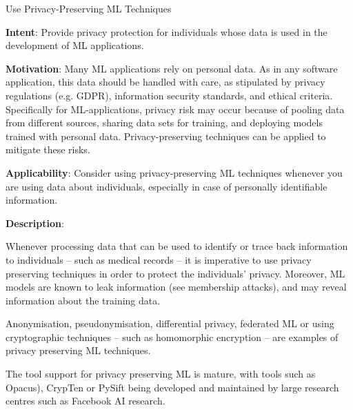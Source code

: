   
  \begin{frame}[plain]{ Use Privacy-Preserving ML Techniques
 }

  \textbf{Intent}: Provide privacy protection for individuals whose data is used in the development of ML applications. 
 

  \textbf{Motivation}: Many ML applications rely on personal data. As in any software application, this data should be handled with care, as stipulated by privacy regulations (e.g. GDPR), information security standards, and ethical criteria. Specifically for ML-applications, privacy risk may occur because of pooling data from different sources, sharing data sets for training, and deploying models trained with personal data. Privacy-preserving techniques can be applied to mitigate these risks. 
 

  \textbf{Applicability}: Consider using privacy-preserving ML techniques whenever you are using data about individuals, especially in case of personally identifiable information. 
 

  \textbf{Description}: 

Whenever processing data that can be used to identify or trace back information to individuals -- such as medical records -- it is imperative to use privacy preserving techniques in order to protect the individuals' privacy.
Moreover, ML models are known to leak information (see membership attacks), and may reveal information about the training data.


Anonymisation, pseudonymisation, differential privacy, federated ML or using cryptographic techniques -- such as homomorphic encryption -- are examples of privacy preserving ML techniques.


The tool support for privacy preserving ML is mature, with tools such as Opacus), CrypTen or PySift being developed and maintained by large research centres such as Facebook AI research.


 


  \end{frame}

